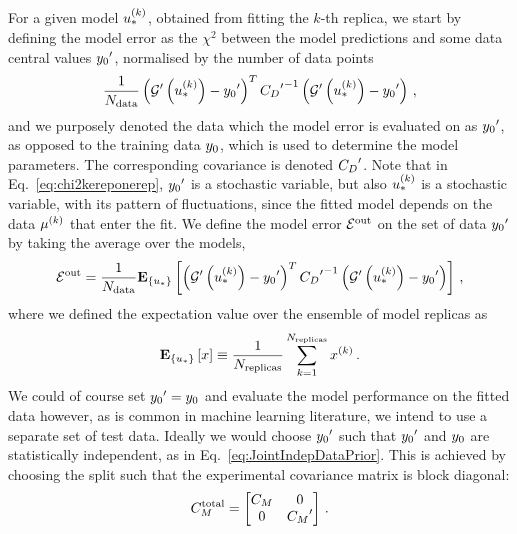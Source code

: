 For a given model $u_*^{(k)}$, obtained from fitting the $k$-th replica, we
start by defining the model error as the $\chi^2$ between the model predictions
and some data central values ${{y_0}^{\prime}}$, normalised by the number
of data points
\begin{equation}
    \label{eq:chi2kereponerep}
    \frac{1}{N_{\rm data}} 
        \left( {{\mathcal{G}}^{\prime}}\left(u_*^{(k)}\right) - {{y_0}^{\prime}} \right)^T
        {{C_{D}}^{\prime}}^{-1}
        \left( {{\mathcal{G}}^{\prime}}\left(u_*^{(k)}\right) - {{y_0}^{\prime}} \right)\, ,
\end{equation}
and we purposely denoted the data which the model error is evaluated on as
${{y_0}^{\prime}}$, as opposed to the training data $y_0$,
which is used to determine the model parameters. The corresponding covariance is 
denoted ${{C_{D}}^{\prime}}$. Note that in
Eq.~\ref{eq:chi2kereponerep}, ${{y_0}^{\prime}}$ is a stochastic
variable, but also $u_*^{(k)}$ is a stochastic variable, with its pattern of
fluctuations, since the fitted model depends on the data $\mu^{(k)}$
that enter the fit. We define the model error $\mathcal{E}^{\rm out}$ on the set of data
${{y_0}^{\prime}}$ by taking the average over the models,
\begin{equation}
    \label{eq:chi2kerep}
    \mathcal{E}^{\rm out} = \frac{1}{N_{\rm data}} \mathbf{E}_{\{ u_* \}} \left[ 
        \left( {{\mathcal{G}}^{\prime}}\left(u_*^{(k)}\right) - {{y_0}^{\prime}} \right)^T
        {{C_{D}}^{\prime}}^{-1}
        \left( {{\mathcal{G}}^{\prime}}\left(u_*^{(k)}\right) - {{y_0}^{\prime}} \right)
     \right]\, ,
\end{equation}
where we defined the expectation value over the ensemble of model replicas as
\begin{equation}
    \mathbf{E}_{\{ u_* \}} \left[ x \right] \equiv \frac{1}{N_{\rm replicas}} \sum_{k=1}^{N_{\rm replicas}} x^{(k)} \, .
\end{equation}
We could of course set ${{y_0}^{\prime}} = y_0$ and evaluate
the model performance on the fitted data however, as is common in machine
learning literature, we intend to use a separate set of test data. Ideally we
would choose ${{y_0}^{\prime}}$ such that ${{y_0}^{\prime}}$ and
$y_0$ are statistically independent, as in
Eq.~\ref{eq:JointIndepDataPrior}. This is achieved by choosing the split such
that the experimental covariance matrix is block diagonal:
\begin{equation}
    C_M^{\rm total} =
    \begin{bmatrix}
        C_M  & 0  \\ 
        0  & {{C_M}^{\prime}}  \\ 
    \end{bmatrix}\, .
\end{equation}

